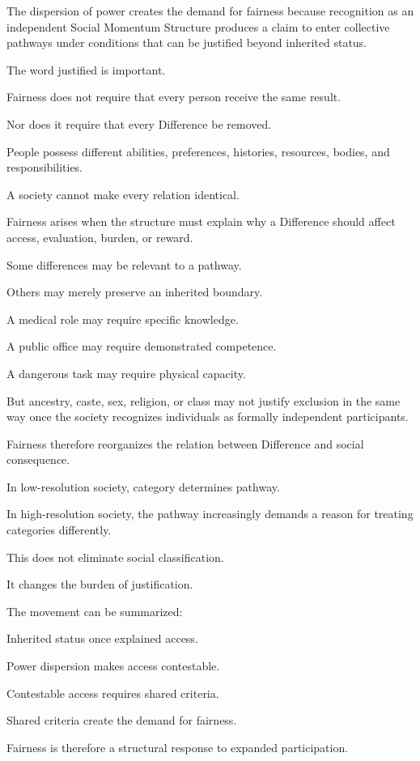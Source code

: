 The dispersion of power creates the demand for fairness because recognition as an independent Social Momentum Structure produces a claim to enter collective pathways under conditions that can be justified beyond inherited status.

The word justified is important.

Fairness does not require that every person receive the same result.

Nor does it require that every Difference be removed.

People possess different abilities, preferences, histories, resources, bodies, and responsibilities.

A society cannot make every relation identical.

Fairness arises when the structure must explain why a Difference should affect access, evaluation, burden, or reward.

Some differences may be relevant to a pathway.

Others may merely preserve an inherited boundary.

A medical role may require specific knowledge.

A public office may require demonstrated competence.

A dangerous task may require physical capacity.

But ancestry, caste, sex, religion, or class may not justify exclusion in the same way once the society recognizes individuals as formally independent participants.

Fairness therefore reorganizes the relation between Difference and social consequence.

In low-resolution society, category determines pathway.

In high-resolution society, the pathway increasingly demands a reason for treating categories differently.

This does not eliminate social classification.

It changes the burden of justification.

The movement can be summarized:

Inherited status once explained access.

Power dispersion makes access contestable.

Contestable access requires shared criteria.

Shared criteria create the demand for fairness.

Fairness is therefore a structural response to expanded participation.

